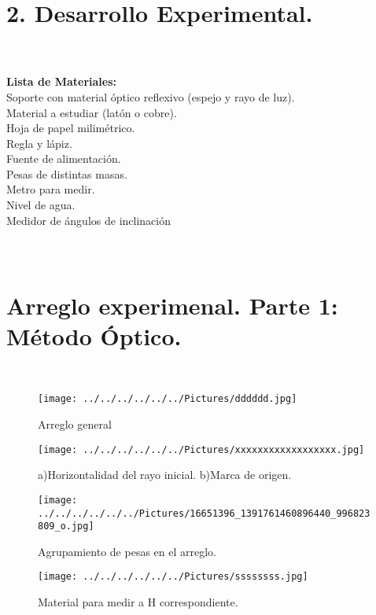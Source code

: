 \documentclass[10pt,a4paper]{article}
\begin{document}
\section*{2.  Desarrollo Experimental.}\\

 \\
\textbf{Lista de Materiales:} \\
Soporte con material \'{o}ptico reflexivo (espejo y rayo de luz).\\
Material a estudiar (lat\'{o}n o cobre). \\
Hoja de papel milim\'{e}trico. \\
Regla y l\'{a}piz. \\
Fuente de alimentaci\'{o}n.\\
Pesas de distintas masas. \\
Metro para medir. \\
Nivel de agua. \\
Medidor de \'{a}ngulos de inclinaci\'{o}n \\
\\
\\
\section*{Arreglo experimenal. Parte 1: M\'{e}todo \'{O}ptico.} \\

\begin{figure}[hbtp]
\centering
\texttt{[image: ../../../../../../Pictures/dddddd.jpg]}   
\caption{Arreglo general}
\end{figure}

\begin{figure}[hbtp]
\centering
\texttt{[image: ../../../../../../Pictures/xxxxxxxxxxxxxxxxxx.jpg]} 
\caption{a)Horizontalidad del rayo inicial.  b)Marca de origen. }
\end{figure}

\begin{figure}[hbtp]
\centering
\texttt{[image: ../../../../../../Pictures/16651396\_1391761460896440\_996823809\_o.jpg]}  
\caption{Agrupamiento de pesas en el arreglo.}
\end{figure}

\begin{figure}[hbtp]
\centering
\texttt{[image: ../../../../../../Pictures/ssssssss.jpg]}  
\caption{Material para medir a H correspondiente.}
\end{figure}
\pagebreak 
\end{document}
